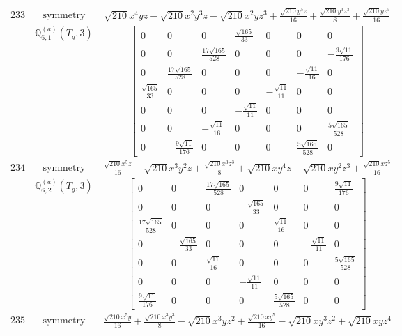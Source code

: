 \documentclass[fleqn,8pt,landscape]{jsarticle}
\begin{document}
\begin{longtable}{ccc}
$ 233 $ & $ \text{symmetry} $ & $ \sqrt{210} x^{4} y z - \sqrt{210} x^{2} y^{3} z - \sqrt{210} x^{2} y z^{3} + \frac{\sqrt{210} y^{5} z}{16} + \frac{\sqrt{210} y^{3} z^{3}}{8} + \frac{\sqrt{210} y z^{5}}{16} $ \\
$  $ & $ \mathbb{Q}_{6,1}^{(a)}(T_{g},3) $ & $ \begin{bmatrix} 0 & 0 & 0 & \frac{\sqrt{165}}{33} & 0 & 0 & 0 \\ 0 & 0 & \frac{17 \sqrt{165}}{528} & 0 & 0 & 0 & - \frac{9 \sqrt{11}}{176} \\ 0 & \frac{17 \sqrt{165}}{528} & 0 & 0 & 0 & - \frac{\sqrt{11}}{16} & 0 \\ \frac{\sqrt{165}}{33} & 0 & 0 & 0 & - \frac{\sqrt{11}}{11} & 0 & 0 \\ 0 & 0 & 0 & - \frac{\sqrt{11}}{11} & 0 & 0 & 0 \\ 0 & 0 & - \frac{\sqrt{11}}{16} & 0 & 0 & 0 & \frac{5 \sqrt{165}}{528} \\ 0 & - \frac{9 \sqrt{11}}{176} & 0 & 0 & 0 & \frac{5 \sqrt{165}}{528} & 0 \end{bmatrix} $ \\ \hline
$ 234 $ & $ \text{symmetry} $ & $ \frac{\sqrt{210} x^{5} z}{16} - \sqrt{210} x^{3} y^{2} z + \frac{\sqrt{210} x^{3} z^{3}}{8} + \sqrt{210} x y^{4} z - \sqrt{210} x y^{2} z^{3} + \frac{\sqrt{210} x z^{5}}{16} $ \\
$  $ & $ \mathbb{Q}_{6,2}^{(a)}(T_{g},3) $ & $ \begin{bmatrix} 0 & 0 & \frac{17 \sqrt{165}}{528} & 0 & 0 & 0 & \frac{9 \sqrt{11}}{176} \\ 0 & 0 & 0 & - \frac{\sqrt{165}}{33} & 0 & 0 & 0 \\ \frac{17 \sqrt{165}}{528} & 0 & 0 & 0 & \frac{\sqrt{11}}{16} & 0 & 0 \\ 0 & - \frac{\sqrt{165}}{33} & 0 & 0 & 0 & - \frac{\sqrt{11}}{11} & 0 \\ 0 & 0 & \frac{\sqrt{11}}{16} & 0 & 0 & 0 & \frac{5 \sqrt{165}}{528} \\ 0 & 0 & 0 & - \frac{\sqrt{11}}{11} & 0 & 0 & 0 \\ \frac{9 \sqrt{11}}{176} & 0 & 0 & 0 & \frac{5 \sqrt{165}}{528} & 0 & 0 \end{bmatrix} $ \\ \hline
$ 235 $ & $ \text{symmetry} $ & $ \frac{\sqrt{210} x^{5} y}{16} + \frac{\sqrt{210} x^{3} y^{3}}{8} - \sqrt{210} x^{3} y z^{2} + \frac{\sqrt{210} x y^{5}}{16} - \sqrt{210} x y^{3} z^{2} + \sqrt{210} x y z^{4} $ \\

\end{longtable}
\end{document}
